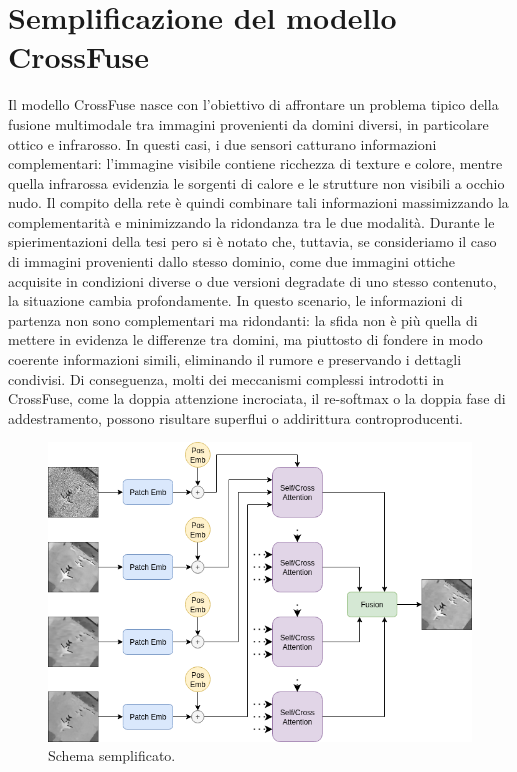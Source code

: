 \section{Semplificazione del modello CrossFuse}
Il modello CrossFuse nasce con l’obiettivo di affrontare un problema tipico della fusione multimodale tra immagini provenienti da 
domini diversi, in particolare ottico e infrarosso. In questi casi, i due sensori catturano informazioni complementari: l’immagine 
visibile contiene ricchezza di texture e colore, mentre quella infrarossa evidenzia le sorgenti di calore e le strutture non 
visibili a occhio nudo. Il compito della rete è quindi combinare tali informazioni massimizzando la complementarità e 
minimizzando la ridondanza tra le due modalità. Durante le spierimentazioni della tesi pero si è notato che,
tuttavia, se consideriamo il caso di immagini provenienti dallo stesso dominio, come due immagini ottiche acquisite in condizioni 
diverse o due versioni degradate di uno stesso contenuto, la situazione cambia profondamente.
In questo scenario, le informazioni di partenza non sono complementari ma ridondanti: la sfida non è più quella di mettere in evidenza 
le differenze tra domini, ma piuttosto di fondere in modo coerente informazioni simili, eliminando il rumore e preservando i dettagli condivisi.
Di conseguenza, molti dei meccanismi complessi introdotti in CrossFuse, come la doppia attenzione incrociata, il re-softmax o la doppia fase di addestramento, 
possono risultare superflui o addirittura controproducenti.
\begin{figure}[H]
  \centering
  \includegraphics[width=1.0\textwidth]{utils/schema.png}
  \caption{Schema semplificato.}
  \label{fig:schema}
\end{figure}
